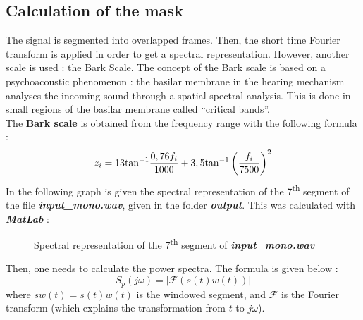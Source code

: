 \subsection{Calculation of the mask}
The signal is segmented into overlapped frames. Then, the short time Fourier transform is applied in order to get a spectral representation. However, another scale is used : the Bark Scale. The concept of the Bark scale is based on a psychoacoustic phenomenon : the basilar membrane in the hearing mechanism analyses the incoming sound through a spatial-spectral analysis. This is done in small regions of the basilar membrane called “critical bands”.\\
The \textbf{Bark scale} is obtained from the frequency range with the following formula :
$$z_i = 13\textnormal{tan}^{-1}\frac{0,76f_i}{1000}+3,5\textnormal{tan}^{-1}\left(\frac{f_i}{7500}\right)^2$$
In the following graph is given the spectral representation of the 7\textsuperscript{th} segment of the file \textbf{\textit{input\_mono.wav}}, given in the folder \textbf{\textit{output}}. This was calculated with \textbf{\textit{MatLab}} :
\begin{figure}[H]
\caption{Spectral representation of the 7\textsuperscript{th} segment of \textbf{\textit{input\_mono.wav}}}
\end{figure}

Then, one needs to calculate the power spectra. The formula is given below :
$$S_p(j\omega) = 	|\mathcal{F}(s(t)w(t))|$$
where $sw(t) = s(t)w(t)$ is the windowed segment, and $\mathcal{F}$ is the Fourier transform (which explains the transformation from $t$ to $j\omega$).

